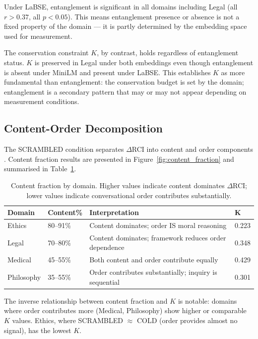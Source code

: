 \documentclass[11pt,a4paper]{article}
\begin{document}
Under LaBSE, entanglement is significant in all domains including Legal (all $r > 0.37$,
all $p < 0.05$). This means entanglement presence or absence is not a fixed property
of the domain --- it is partly determined by the embedding space used for measurement.

The conservation constraint $K$, by contrast, holds regardless of entanglement status.
$K$ is preserved in Legal under both embeddings even though entanglement is absent under
MiniLM and present under LaBSE. This establishes $K$ as more fundamental than
entanglement: the conservation budget is set by the domain; entanglement is a secondary
pattern that may or may not appear depending on measurement conditions.

\subsection{Content-Order Decomposition}

The SCRAMBLED condition separates $\Delta$RCI into content and order components
\citep{laxman2026g}. Content fraction results are presented in
Figure~\ref{fig:content_fraction} and summarised in Table~\ref{tab:content_order}.

\begin{table}[H]
\centering
\caption{Content fraction by domain. Higher values indicate content dominates
$\Delta$RCI; lower values indicate conversational order contributes substantially.}
\label{tab:content_order}
\begin{tabular}{llll}
\toprule
\textbf{Domain} & \textbf{Content\%} & \textbf{Interpretation} & \textbf{K} \\
\midrule
Ethics      & 80--91\% & Content dominates; order IS moral reasoning & 0.223 \\
Legal       & 70--80\% & Content dominates; framework reduces order dependence & 0.348 \\
Medical     & 45--55\% & Both content and order contribute equally & 0.429 \\
Philosophy  & 35--55\% & Order contributes substantially; inquiry is sequential & 0.301 \\
\bottomrule
\end{tabular}
\end{table}

The inverse relationship between content fraction and $K$ is notable: domains where
order contributes more (Medical, Philosophy) show higher or comparable $K$ values.
Ethics, where SCRAMBLED $\approx$ COLD (order provides almost no signal), has the
lowest $K$.
\end{document}
